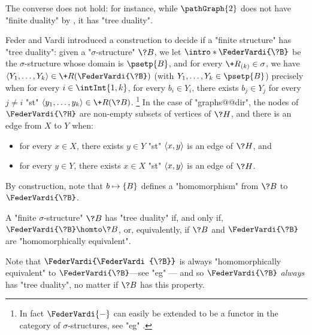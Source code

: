 The converse does not hold:
for instance, while $\pathGraph{2}$ does not have "finite duality" by ,
it has "tree duality".

Feder and Vardi introduced a construction to decide if a "finite structure" has "tree duality":
given a "$\sigma$-structure" $\?B$, we let \AP$\intro*\FederVardi{\?B}$ be
the $\sigma$-structure whose domain is $\psetp{B}$, and for every $\+R_{(k)} \in \sigma$,
we have $\tup{Y_1, \dotsc, Y_k} \in \+R(\FederVardi{\?B})$ 
(with $Y_1, \dotsc, Y_k \in \psetp{B}$) precisely when 
for every $i\in \intInt{1,k}$, 
for every $b_i \in Y_i$,
there exists $b_j \in Y_j$ for every $j \neq i$ "st" 
$\tup{y_1, \dotsc, y_k} \in \+R(\?B)$.%
\footnote{In fact $\FederVardi{-}$ can
easily be extended to be a functor in the category of $\sigma$-structures, see
"eg" \cite[\S~9.2.2]{NesetrilPOM2012FirstOrderCSPs}.}
In the case of "graphs@@dir", the nodes of $\FederVardi{\?H}$ are non-empty
subsets of vertices of $\?H$, and there is an edge from $X$ to $Y$ when:
\begin{itemize}
	\item for every $x \in X$, there exists $y\in Y$ "st" $\langle x,y\rangle$ is an edge of $\?H$, and
	\item for every $y\in Y$, there exists $x\in X$ "st" $\langle x,y\rangle$ is an edge of $\?H$.
\end{itemize}

By construction, note that $b \mapsto \{B\}$ defines a "homomorphism" from
$\?B$ to $\FederVardi{\?B}$.

\begin{proposition}
	\label{prop:charac-Feder-Vardi}
	A "finite $\sigma$-structure" $\?B$ has "tree duality" if, and only if,
	$\FederVardi{\?B} \homto \?B$, or, equivalently, if $\?B$ and $\FederVardi{\?B}$
	are "homomorphically equivalent".
\end{proposition}

Note that $\FederVardi{\FederVardi{\?B}}$ is always "homomorphically equivalent" to
$\FederVardi{\?B}$---see "eg" \cite[\S~9.2.2, Proposition 9.1]{NesetrilPOM2012FirstOrderCSPs}---
and so $\FederVardi{\?B}$ \emph{always} has "tree duality", no matter if $\?B$ has this property.

